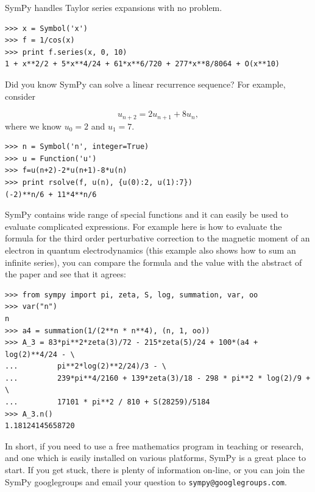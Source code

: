 \documentclass[12pt]{article}
\begin{document}
SymPy handles Taylor series expansions with no problem.

\begin{Verbatim}[fontsize=\scriptsize,fontfamily=courier,fontshape=tt,frame=single,label=SymPy]
>>> x = Symbol('x')
>>> f = 1/cos(x)
>>> print f.series(x, 0, 10)
1 + x**2/2 + 5*x**4/24 + 61*x**6/720 + 277*x**8/8064 + O(x**10)
\end{Verbatim}

Did you know SymPy can solve a linear recurrence sequence?
For example, consider

\[
 u_{n+2} = 2  u_{n+1} + 8  u_{n},
\]
where we know $u_{0} = 2$ and $u_{1} = 7$.

\begin{Verbatim}[fontsize=\scriptsize,fontfamily=courier,fontshape=tt,frame=single,label=SymPy]
>>> n = Symbol('n', integer=True)
>>> u = Function('u')
>>> f=u(n+2)-2*u(n+1)-8*u(n)
>>> print rsolve(f, u(n), {u(0):2, u(1):7})
(-2)**n/6 + 11*4**n/6
\end{Verbatim}

SymPy contains wide range of special functions and it can easily be used to
evaluate complicated expressions. For example here is how to evaluate the
formula for the third order perturbative correction to the
magnetic moment of an electron in quantum electrodynamics (this example also
shows how to sum an infinite series), you can compare the formula and the value
with the abstract of the paper \cite{QED} and see that it agrees:

\begin{Verbatim}[fontsize=\scriptsize,fontfamily=courier,fontshape=tt,frame=single,label=SymPy]
>>> from sympy import pi, zeta, S, log, summation, var, oo
>>> var("n")
n
>>> a4 = summation(1/(2**n * n**4), (n, 1, oo))
>>> A_3 = 83*pi**2*zeta(3)/72 - 215*zeta(5)/24 + 100*(a4 + log(2)**4/24 - \
...         pi**2*log(2)**2/24)/3 - \
...         239*pi**4/2160 + 139*zeta(3)/18 - 298 * pi**2 * log(2)/9 + \
...         17101 * pi**2 / 810 + S(28259)/5184
>>> A_3.n()
1.18124145658720
\end{Verbatim}

\vskip 0.3in

In short, if you need to use a free mathematics program in teaching or
research, and one which is easily installed on various platforms,
SymPy is a great place to start. If you get stuck, there is plenty of
information
on-line, or you can join the SymPy googlegroups and
email your question to {\tt sympy@googlegroups.com}.

\vskip 0.3in
\end{document}
